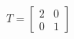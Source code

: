\documentclass[preview]{standalone}
\begin{document}
\begin{align*}
T = \begin{bmatrix} 2 & 0 \\ 0 & 1\end{bmatrix}
\end{align*}
\end{document}
